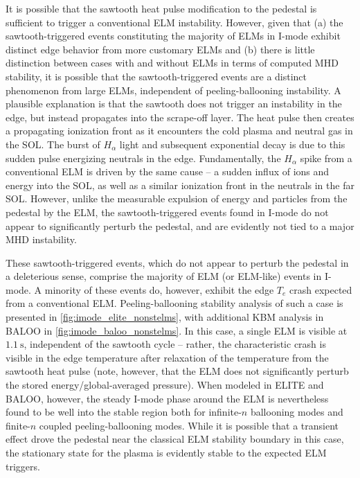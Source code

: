 It is possible that the sawtooth heat pulse modification to the pedestal is sufficient to trigger a conventional ELM instability.  However, given that (a) the sawtooth-triggered events constituting the majority of ELMs in I-mode exhibit distinct edge behavior from more customary ELMs and (b) there is little distinction between cases with and without ELMs in terms of computed MHD stability, it is possible that the sawtooth-triggered events are a distinct phenomenon from large ELMs, independent of peeling-ballooning instability.  A plausible explanation is that the sawtooth does not trigger an instability in the edge, but instead propagates into the scrape-off layer.  The heat pulse then creates a propagating ionization front as it encounters the cold plasma and neutral gas in the SOL.  The burst of $H_\alpha$ light and subsequent exponential decay is due to this sudden pulse energizing neutrals in the edge.  Fundamentally, the $H_\alpha$ spike from a conventional ELM is driven by the same cause -- a sudden influx of ions and energy into the SOL, as well as a similar ionization front in the neutrals in the far SOL.  However, unlike the measurable expulsion of energy and particles from the pedestal by the ELM, the sawtooth-triggered events found in I-mode do not appear to significantly perturb the pedestal, and are evidently not tied to a major MHD instability.

These sawtooth-triggered events, which do not appear to perturb the pedestal in a deleterious sense, comprise the majority of ELM (or ELM-like) events in I-mode.  A minority of these events do, however, exhibit the edge $T_e$ crash expected from a conventional ELM.  Peeling-ballooning stability analysis of such a case is presented in \cref{fig:imode_elite_nonstelms}, with additional KBM analysis in BALOO in \cref{fig:imode_baloo_nonstelms}.  In this case, a single ELM is visible at $\SI{1.1}{\second}$, independent of the sawtooth cycle -- rather, the characteristic crash is visible in the edge temperature after relaxation of the temperature from the sawtooth heat pulse (note, however, that the ELM does not significantly perturb the stored energy/global-averaged pressure).  When modeled in ELITE and BALOO, however, the steady I-mode phase around the ELM is nevertheless found to be well into the stable region both for infinite-$n$ ballooning modes and finite-$n$ coupled peeling-ballooning modes.  While it is possible that a transient effect drove the pedestal near the classical ELM stability boundary in this case, the stationary state for the plasma is evidently stable to the expected ELM triggers.\nicesectionending


